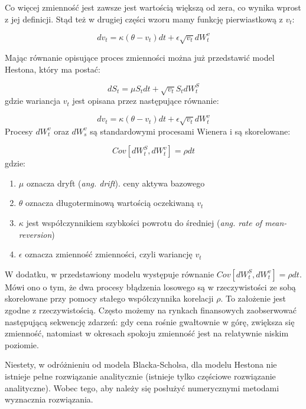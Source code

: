 \documentclass{pracamgr}
\begin{document}
Co więcej zmienność jest zawsze jest wartością większą od zera, co wynika wprost z jej definicji. Stąd też w drugiej części wzoru mamy funkcję pierwiastkową z $v_t$: 

\begin{equation} 
dv_t  = \kappa (\theta - v_t)dt + \epsilon \sqrt{v_t} dW_t^v 
\end{equation}

Mając równanie opisujące proces zmienności można już przedstawić model Hestona, który ma postać:

\begin{equation}
dS_t  = \mu S_t dt + \sqrt{v_t} S_t dW^S_t
\end{equation}
gdzie wariancja $v_t$ jest opisana przez następujące równanie: 

\begin{equation}
dv_t  = \kappa (\theta - v_t)dt + \epsilon \sqrt{v_t} dW_t^v 
\end{equation}
Procesy $dW_t^v$ oraz $dW_s^v$ są standardowymi procesami Wienera i są skorelowane:

\begin{equation}
Cov[dW^S_t, dW^v_t] = \rho dt 
\end{equation}
gdzie:

\begin{enumerate}
\item $\mu$ oznacza dryft (\textit{ang. drift}). ceny aktywa bazowego 
\item $\theta$ oznacza długoterminową wartością oczekiwaną $v_t$
\item $\kappa$ jest współczynnikiem szybkości powrotu do średniej (\textit{ang. rate of mean-reversion})
\item $\epsilon$ oznacza zmienność zmienności, czyli wariancję $v_t$
\end{enumerate}

W dodatku, w przedstawiony modelu występuje równanie $Cov[dW^S_t, dW^v_t] = \rho dt $. Mówi ono o tym, że 
dwa procesy błądzenia losowego są w rzeczywistości ze sobą skorelowane przy pomocy stałego współczynnika 
korelacji $\rho$.
To założenie jest zgodne z rzeczywistością. Często możemy na rynkach finansowych zaobserwować następującą sekwencję zdarzeń: gdy cena rośnie gwałtownie w górę, zwiększa się zmienność, 
natomiast w okresach spokoju zmienność jest na relatywnie niskim poziomie.

Niestety, w odróżnieniu od modela Blacka-Scholsa, dla modelu Hestona nie istnieje pełne rozwiązanie analitycznie (istnieje tylko częściowe rozwiązanie analityczne). Wobec tego, aby należy się posłużyć numerycznymi metodami wyznacznia rozwiązania.
\end{document}
